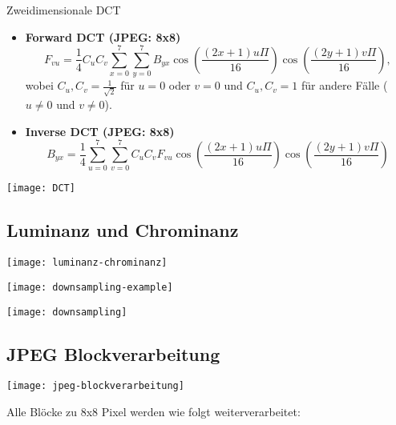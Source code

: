 \begin{definition}{Zweidimensionale DCT}
    \begin{itemize}
        \item \textbf{Forward DCT (JPEG: 8x8)} \[F_{vu} = \frac{1}{4} C_u C_v \sum_{x=0}^{7} \sum_{y=0}^{7} B_{yx} \cos \left( \frac{(2x+1)u\Pi}{16} \right) \cos \left( \frac{(2y+1)v\Pi}{16} \right),\] wobei $C_u,C_v = \frac{1}{\sqrt{2}}$ für $u=0$ oder $v=0$ und $C_u,C_v = 1$ für andere Fälle ($u \neq 0$ und $v \neq 0$).
        \item \textbf{Inverse DCT (JPEG: 8x8)} \[B_{yx} = \frac{1}{4} \sum_{u=0}^{7} \sum_{v=0}^{7} C_u C_v F_{vu} \cos \left( \frac{(2x+1)u\Pi}{16} \right) \cos \left( \frac{(2y+1)v\Pi}{16} \right)\]
    \end{itemize}
\end{definition}
\begin{center}
    \texttt{[image: DCT]}
\end{center}

\newpage

\subsection{Luminanz und Chrominanz}\label{subsec:luminanz-und-chrominanz}
\begin{multicols}{2}
    \begin{center}
        \texttt{[image: luminanz-chrominanz]}
    \end{center}
    \begin{center}
        \texttt{[image: downsampling-example]}
    \end{center}
\end{multicols}
\begin{center}
    \texttt{[image: downsampling]}
\end{center}

\subsection{JPEG Blockverarbeitung}\label{subsec:jpeg-blockverarbeitung}

\begin{center}
    \texttt{[image: jpeg-blockverarbeitung]}
\end{center}

Alle Blöcke zu 8x8 Pixel werden wie folgt weiterverarbeitet:

